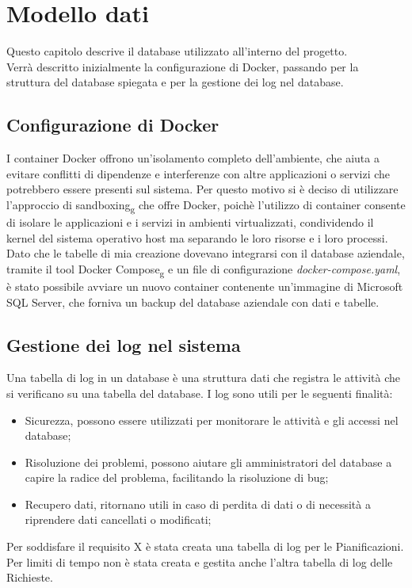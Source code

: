 \chapter{Modello dati}
\label{cap:database}
Questo capitolo descrive il database utilizzato all'interno del progetto.\\
Verrà descritto inizialmente la configurazione di Docker, passando per la struttura del database spiegata e per la gestione dei log nel database.\\

\section{Configurazione di Docker}
I container Docker offrono un'isolamento completo dell'ambiente, che aiuta a evitare conflitti di dipendenze e interferenze con altre applicazioni o servizi che potrebbero essere presenti sul sistema. Per questo motivo si è deciso di utilizzare l'approccio di sandboxing\textsubscript{g} che offre Docker, poichè l'utilizzo di container consente di isolare le applicazioni e i servizi in ambienti virtualizzati, condividendo il kernel del sistema operativo host ma separando le loro risorse e i loro processi.\\
Dato che le tabelle di mia creazione dovevano integrarsi con il database aziendale, tramite il tool Docker Compose\textsubscript{g} e un file di configurazione \textit{docker-compose.yaml}, è stato possibile avviare un nuovo container contenente un'immagine di Microsoft SQL Server, che forniva un backup del database aziendale con dati e tabelle.\\



\section{Gestione dei log nel sistema}
Una tabella di log in un database è una struttura dati che registra le attività che si verificano su una tabella del database. I log sono utili per le seguenti finalità:
\begin{itemize}
\item Sicurezza, possono essere utilizzati per monitorare le attività e gli accessi nel database;
\item Risoluzione dei problemi, possono aiutare gli amministratori del database a capire la radice del problema, facilitando la risoluzione di bug;
\item Recupero dati, ritornano utili in caso di perdita di dati o di necessità a riprendere dati cancellati o modificati;
\end{itemize} 
Per soddisfare il requisito X è stata creata una tabella di log per le Pianificazioni.
Per limiti di tempo non è stata creata e gestita anche l'altra tabella di log delle Richieste.\\
